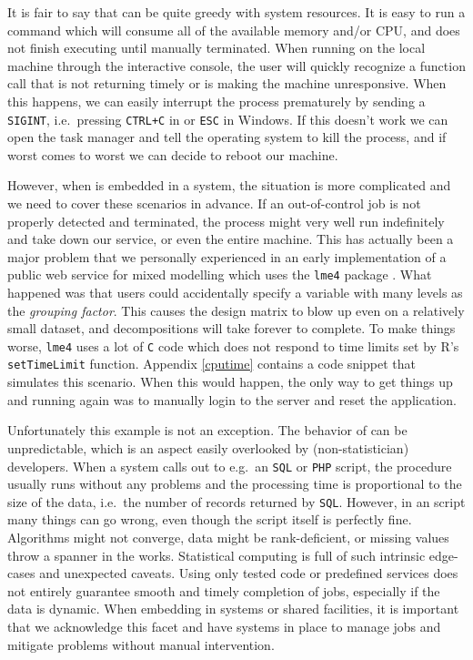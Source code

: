 It is fair to say that \R can be quite greedy with system resources. It is easy
to run a command which will consume all of the available memory and/or CPU, and
does not finish executing until manually terminated. When running \R on the
local machine through the interactive console, the user will quickly recognize a
function call that is not returning timely or is making the machine
unresponsive. When this happens, we can easily interrupt the process prematurely
by sending a \texttt{SIGINT}, i.e.\ pressing \texttt{CTRL+C} in \Linux or
\texttt{ESC} in Windows. If this doesn't work we can open the task manager and
tell the operating system to kill the process, and if worst comes to worst we
can decide to reboot our machine.

However, when \R is embedded in a system, the situation is more complicated and
we need to cover these scenarios in advance. If an out-of-control \R job is not
properly detected and terminated, the process might very well run indefinitely
and take down our service, or even the entire machine. This has actually been a
major problem that we personally experienced in an early implementation of a
public web service for mixed modelling \citep{yeroonlme4} which uses the
\texttt{lme4} package \citep{lme4}. What happened was that users could
accidentally specify a variable with many levels as the \emph{grouping factor}.
This causes the design matrix to blow up even on a relatively small dataset, and
decompositions will take forever to complete. To make things worse,
\texttt{lme4} uses a lot of \texttt{C} code which does not respond to time
limits set by R's \texttt{setTimeLimit} function. Appendix \ref{cputime}
contains a code snippet that simulates this scenario. When this would happen,
the only way to get things up and running again was to manually login to the
server and reset the application.

Unfortunately this example is not an exception. The behavior of \R can be
unpredictable, which is an aspect easily overlooked by (non-statistician)
developers. When a system calls out to e.g.\ an \texttt{SQL} or \texttt{PHP}
script, the procedure usually runs without any problems and the processing time
is proportional to the size of the data, i.e.\ the number of records returned by
\texttt{SQL}. However, in an \R script many things can go wrong, even though the
script itself is perfectly fine.  Algorithms might not converge, data might be
rank-deficient, or missing values throw a spanner in the works.
Statistical computing is full of such intrinsic edge-cases and unexpected
caveats.
Using only tested code or predefined services does not entirely guarantee smooth
and timely completion of \R jobs, especially if the data is dynamic. When
embedding \R in systems or shared facilities, it is important that we
acknowledge this facet and have systems in place to manage jobs and mitigate
problems without manual intervention.

